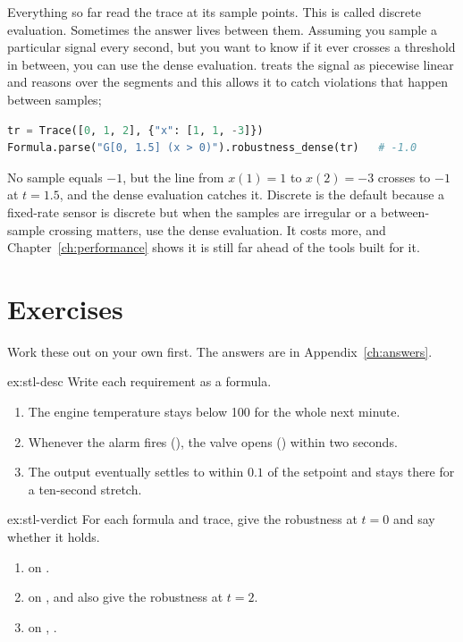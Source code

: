 Everything so far read the trace at its sample points. This is called discrete evaluation. Sometimes the answer lives between them. Assuming you sample a particular signal every second, but you want to know if it ever crosses a threshold in between, you can use the dense evaluation. \sentil{} treats the signal as piecewise linear and reasons over the segments and this allows it to catch violations that happen between samples;

\begin{lstlisting}[language=Python]
tr = Trace([0, 1, 2], {"x": [1, 1, -3]})
Formula.parse("G[0, 1.5] (x > 0)").robustness_dense(tr)   # -1.0
\end{lstlisting}

No sample equals $-1$, but the line from $x(1){=}1$ to $x(2){=}{-}3$ crosses to $-1$ at $t=1.5$, and the dense evaluation catches it. Discrete is the default because a fixed-rate sensor is discrete but when the samples are irregular or a between-sample crossing matters, use the dense evaluation. It costs more, and Chapter~\ref{ch:performance} shows it is still far ahead of the tools built for it.

\section{Exercises}

Work these out on your own first. The answers are in Appendix~\ref{ch:answers}.

\begin{exercise}{ex:stl-desc}
Write each requirement as a \sentil{} formula.
\begin{enumerate}[label=(\alph*), leftmargin=1.6em, topsep=2pt]
  \item The engine temperature stays below 100 for the whole next minute.
  \item Whenever the alarm fires (), the valve opens () within two seconds.
  \item The output eventually settles to within $0.1$ of the setpoint and stays there for a ten-second stretch.
\end{enumerate}
\end{exercise}

\begin{exercise}{ex:stl-verdict}
For each formula and trace, give the robustness at $t=0$ and say whether it holds.
\begin{enumerate}[label=(\alph*), leftmargin=1.6em, topsep=2pt]
  \item {} on .
  \item {} on , and also give the robustness at $t=2$.
  \item {} on , .
\end{enumerate}
\end{exercise}

